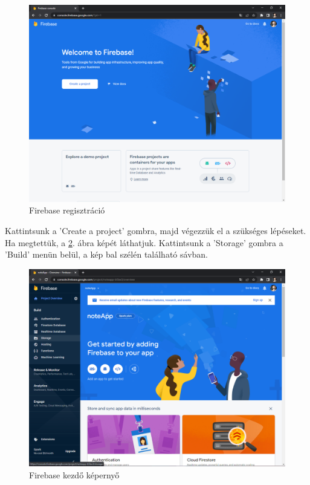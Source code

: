 \begin{figure}[H]
	\centering
	\includegraphics[scale=0.2]{images/config_2.png}
	\caption{Firebase regisztráció}
	\label{fig:firebase_reg}
\end{figure}
\noindent Kattintsunk a 'Create a project' gombra, majd végezzük el a szükséges lépéseket.
\\Ha megtettük, a \ref{fig:firebase_storage_reg}. ábra képét láthatjuk. Kattintsunk a 'Storage' gombra a 'Build' menün belül, a kép bal szélén található sávban.

\begin{figure}[H]
	\centering
	\includegraphics[scale=0.2]{images/config_3.png}
	\caption{Firebase kezdő képernyő}
	\label{fig:firebase_storage_reg}
\end{figure}

